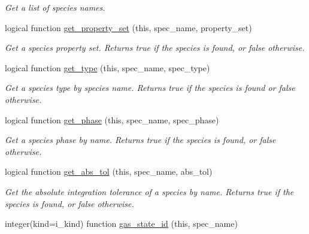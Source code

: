\begin{DoxyCompactItemize}
\begin{DoxyCompactList}\small\item\em Get a list of species names. \end{DoxyCompactList}\item 
logical function \mbox{\hyperlink{namespacepmc__chem__spec__data_a046d71071a7e6a8511e9920d6aea8052}{get\+\_\+property\+\_\+set}} (this, spec\+\_\+name, property\+\_\+set)
\begin{DoxyCompactList}\small\item\em Get a species property set. Returns true if the species is found, or false otherwise. \end{DoxyCompactList}\item 
logical function \mbox{\hyperlink{namespacepmc__chem__spec__data_a5a66d5eac7fdf70683cd8ffce529a45c}{get\+\_\+type}} (this, spec\+\_\+name, spec\+\_\+type)
\begin{DoxyCompactList}\small\item\em Get a species type by species name. Returns true if the species is found or false otherwise. \end{DoxyCompactList}\item 
logical function \mbox{\hyperlink{namespacepmc__chem__spec__data_a2b05b142c1087393cf6504823601c8d5}{get\+\_\+phase}} (this, spec\+\_\+name, spec\+\_\+phase)
\begin{DoxyCompactList}\small\item\em Get a species phase by name. Returns true if the species is found, or false otherwise. \end{DoxyCompactList}\item 
logical function \mbox{\hyperlink{namespacepmc__chem__spec__data_a671b3e9a1bfbb6be6cbbd775a3ac1cb1}{get\+\_\+abs\+\_\+tol}} (this, spec\+\_\+name, abs\+\_\+tol)
\begin{DoxyCompactList}\small\item\em Get the absolute integration tolerance of a species by name. Returns true if the species is found, or false otherwise. \end{DoxyCompactList}\item 
integer(kind=i\+\_\+kind) function \mbox{\hyperlink{namespacepmc__chem__spec__data_a13c05c41c6d75707fc67de54acf5c783}{gas\+\_\+state\+\_\+id}} (this, spec\+\_\+name)

\end{DoxyCompactItemize}
